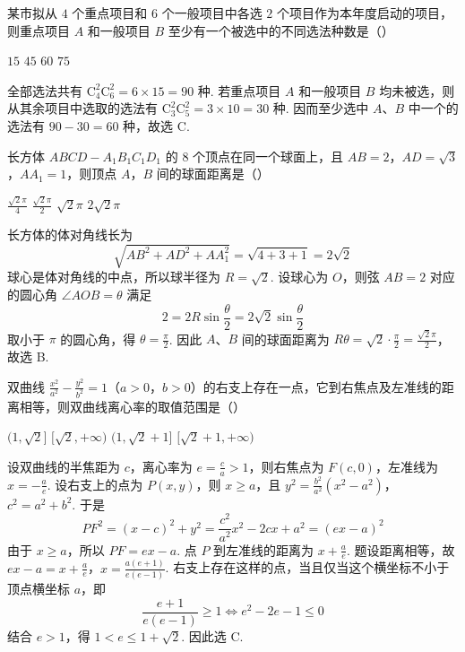 \begin{problem}
某市拟从 \(4\) 个重点项目和 \(6\) 个一般项目中各选 \(2\) 个项目作为本年度启动的项目，则重点项目 \(A\) 和一般项目 \(B\) 至少有一个被选中的不同选法种数是（\quad）

\choices
    {\(15\)}
    {\(45\)}
    {\(60\)}
    {\(75\)}

\begin{solution}
全部选法共有 \(\mathrm C_4^2\mathrm C_6^2=6\times15=90\) 种. 若重点项目 \(A\) 和一般项目 \(B\) 均未被选，则从其余项目中选取的选法有
\(\mathrm C_3^2\mathrm C_5^2=3\times10=30\) 种. 因而至少选中 \(A\)、\(B\) 中一个的选法有
\(90-30=60\) 种，故选 C.
\end{solution}
\end{problem}

\begin{problem}
长方体 \(ABCD - A_{1}B_{1}C_{1}D_{1}\) 的 \(8\) 个顶点在同一个球面上，且 \(AB = 2\)，\(AD = \sqrt{3}\)，\(AA_{1} = 1\)，则顶点 \(A\)，\(B\) 间的球面距离是（\quad）

\choices
    {\(\frac{\sqrt{2}\pi}{4}\)}
    {\(\frac{\sqrt{2}\pi}{2}\)}
    {\(\sqrt{2}\pi\)}
    {\(2\sqrt{2}\pi\)}

\begin{solution}
长方体的体对角线长为
\[
\sqrt{AB^2+AD^2+AA_1^2}=\sqrt{4+3+1}=2\sqrt2
\]
球心是体对角线的中点，所以球半径为 \(R=\sqrt2\). 设球心为 \(O\)，则弦 \(AB=2\) 对应的圆心角 \(\angle AOB=\theta\) 满足
\[
2=2R\sin\frac\theta2=2\sqrt2\sin\frac\theta2
\]
取小于 \(\pi\) 的圆心角，得 \(\theta=\frac\pi2\). 因此 \(A\)、\(B\) 间的球面距离为
\(R\theta=\sqrt2\cdot\frac\pi2=\frac{\sqrt2\pi}{2}\)，故选 B.
\end{solution}
\end{problem}

\begin{problem}
双曲线 \(\frac{x^2}{a^2} - \frac{y^2}{b^2} = 1\)（\(a > 0\)，\(b > 0\)）的右支上存在一点，它到右焦点及左准线的距离相等，则双曲线离心率的取值范围是（\quad）

\choices
    {\((1, \sqrt{2}]\)}
    {\([\sqrt{2}, +\infty)\)}
    {\((1, \sqrt{2} + 1]\)}
    {\([\sqrt{2} + 1, +\infty)\)}

\begin{solution}
设双曲线的半焦距为 \(c\)，离心率为 \(e=\frac ca>1\)，则右焦点为 \(F(c,0)\)，左准线为 \(x=-\frac ae\). 设右支上的点为 \(P(x,y)\)，则 \(x\geqslant a\)，且
\(y^2=\frac{b^2}{a^2}(x^2-a^2)\)，\(c^2=a^2+b^2\).
于是
\[
PF^2=(x-c)^2+y^2
=\frac{c^2}{a^2}x^2-2cx+a^2
=\left(ex-a\right)^2
\]
由于 \(x\geqslant a\)，所以 \(PF=ex-a\). 点 \(P\) 到左准线的距离为 \(x+\frac ae\). 题设距离相等，故
\(ex-a=x+\frac ae\)，\(x=\frac{a(e+1)}{e(e-1)}\).
右支上存在这样的点，当且仅当这个横坐标不小于顶点横坐标 \(a\)，即
\[
\frac{e+1}{e(e-1)}\geqslant1
\iff e^2-2e-1\leqslant0
\]
结合 \(e>1\)，得 \(1<e\leqslant1+\sqrt2\). 因此选 C.
\end{solution}
\end{problem}

